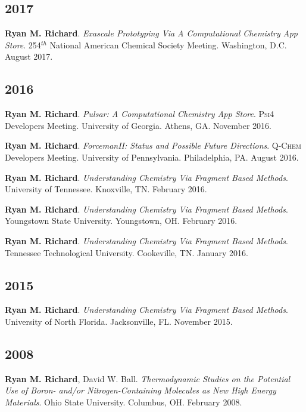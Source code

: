 \documentclass[11pt,a4paper,sans]{moderncv}
\begin{document}
\begin{etaremune}
	\subsection{2017}
	\item{\textbf{Ryan M. Richard}. \textit{Exascale Prototyping Via A 
	      Computational Chemistry App Store}. 254$^{th}$ National American 
		  Chemical Society Meeting.  Washington, D.C. August 2017.}

	\subsection{2016}
	\item{\textbf{Ryan M. Richard}. \textit{Pulsar: A Computational Chemistry App Store}. \textsc{Psi4} Developers Meeting.  University of Georgia.  Athens, GA.  November 2016.}
	\item{\textbf{Ryan M. Richard}. \textit{ForcemanII: Status and Possible Future Directions}.  \textsc{Q-Chem} Developers Meeting.  University of Pennsylvania. Philadelphia, PA. August 2016.}
	\item{\textbf{Ryan M. Richard}. \textit{Understanding Chemistry Via Fragment Based Methods}. University of Tennessee.  Knoxville, TN.  February 2016.}
	\item{\textbf{Ryan M. Richard}. \textit{Understanding Chemistry Via Fragment Based Methods}. Youngstown State University.  Youngstown, OH.  February 2016.}
	\item{\textbf{Ryan M. Richard}. \textit{Understanding Chemistry Via Fragment Based Methods}. Tennessee Technological University.  Cookeville, TN.  January 2016.}
	\subsection{2015}
	\item{\textbf{Ryan M. Richard}. \textit{Understanding Chemistry Via Fragment Based Methods}. University of North Florida.  Jacksonville, FL.  November 2015.}

	\subsection{2008}
	\item{\textbf{Ryan M. Richard}, David W. Ball. \textit{Thermodynamic Studies on the Potential Use of Boron- and/or Nitrogen-Containing Molecules as New High Energy Materials}. Ohio State University. Columbus, OH. February 2008.}
\end{etaremune}
\end{document}
